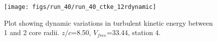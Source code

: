 \begin{figure}[H]
\centering
\texttt{[image: figs/run\_40/run\_40\_ctke\_12rdynamic]}
\caption{Plot showing dynamic variations in turbulent kinetic energy between 1 and 2 core radii. $z/c$=8.50, $V_{free}$=33.44, station 4.}
\label{fig:run_40_ctke_12rdynamic}
\end{figure}


